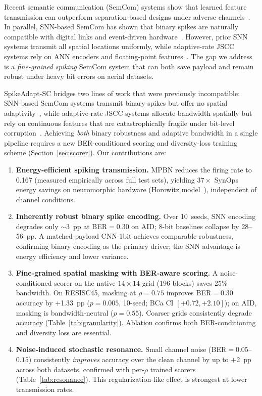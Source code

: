 \documentclass[conference]{IEEEtran}
\begin{document}
Recent semantic communication (SemCom) systems show that learned feature transmission can outperform separation-based designs under adverse channels~\cite{xie2021deep, bourtsoulatze2019deep}. In parallel, SNN-based SemCom has shown that binary spikes are naturally compatible with digital links and event-driven hardware~\cite{wang2024snnsc, wang2023snnsc_harq}. However, prior SNN systems transmit all spatial locations uniformly, while adaptive-rate JSCC systems rely on ANN encoders and floating-point features~\cite{dai2022ntscc, li2024djscc}. The gap we address is a \emph{fine-grained spiking} SemCom system that can both save payload and remain robust under heavy bit errors on aerial datasets.

SpikeAdapt-SC bridges two lines of work that were previously incompatible: SNN-based SemCom systems transmit binary spikes but offer no spatial adaptivity~\cite{wang2024snnsc, wang2023snnsc_harq}, while adaptive-rate JSCC systems allocate bandwidth spatially but rely on continuous features that are catastrophically fragile under bit-level corruption~\cite{dai2022ntscc, li2024djscc}. Achieving \emph{both} binary robustness and adaptive bandwidth in a single pipeline requires a new BER-conditioned scoring and diversity-loss training scheme (Section~\ref{sec:scorer}). Our contributions are:
\begin{enumerate}
    \item \textbf{Energy-efficient spiking transmission.} MPBN reduces the firing rate to 0.167 (measured empirically across full test sets), yielding $37{\times}$ SynOps energy savings on neuromorphic hardware (Horowitz model~\cite{horowitz2014energy}), independent of channel conditions.
    \item \textbf{Inherently robust binary spike encoding.} Over 10~seeds, SNN encoding degrades only $\sim$3~pp at BER$=0.30$ on AID; 8-bit baselines collapse by 28--56~pp. A matched-payload CNN-1bit achieves comparable robustness, confirming binary encoding as the primary driver; the SNN advantage is energy efficiency and lower variance.
    \item \textbf{Fine-grained spatial masking with BER-aware scoring.} A noise-conditioned scorer on the native $14\times14$ grid (196 blocks) saves 25\% bandwidth. On RESISC45, masking at $\rho{=}0.75$ improves BER$=0.30$ accuracy by $+$1.33~pp ($p{=}0.005$, 10-seed; BCa CI $[+0.72, +2.10]$); on AID, masking is bandwidth-neutral ($p{=}0.55$). Coarser grids consistently degrade accuracy (Table~\ref{tab:granularity}). Ablation confirms both BER-conditioning and diversity loss are essential.
    \item \textbf{Noise-induced stochastic resonance.} Small channel noise (BER$=0.05$--$0.15$) consistently \emph{improves} accuracy over the clean channel by up to $+$2~pp across both datasets, confirmed with per-$\rho$ trained scorers (Table~\ref{tab:resonance}). This regularization-like effect is strongest at lower transmission rates.
\end{enumerate}
\end{document}
